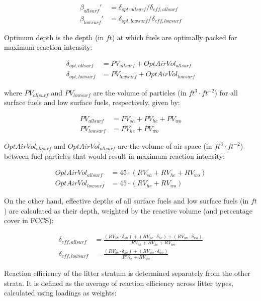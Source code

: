 \documentclass[]{book}
\begin{document}
\begin{eqnarray} 
\beta_{allsurf}' &= \delta_{opt, allsurf} / \delta_{eff, allsurf} \\
\beta_{lowsurf}' &= \delta_{opt, lowsurf} / \delta_{eff, lowsurf}
\label{eq:relpacking}
\end{eqnarray}

Optimum depth is the depth (in \(ft\)) at which fuels are optimally
packed for maximum reaction intensity:

\begin{eqnarray}
\delta_{opt, allsurf} &= PV_{allsurf} +OptAirVol_{allsurf}\\
\delta_{opt, lowsurf} &= PV_{lowsurf} +OptAirVol_{lowsurf}
\end{eqnarray}

where \(PV_{allsurf}\) and \(PV_{lowsurf}\) are the volume of particles
(in \(ft^3 \cdot ft^{-2}\)) for all surface fuels and low surface fuels,
respectively, given by:

\begin{eqnarray}
PV_{allsurf} &= PV_{sh} + PV_{he} + PV_{wo}\\
PV_{lowsurf} &= PV_{he} + PV_{wo}
\end{eqnarray}

\(OptAirVol_{allsurf}\) and \(OptAirVol_{allsurf}\) are the volume of
air space (in \(ft^3 \cdot ft^{-2}\)) between fuel particles that would
result in maximum reaction intensity:

\begin{eqnarray}
OptAirVol_{allsurf} &= 45\cdot (RV_{sh} + RV_{he} + RV_{wo})\\
OptAirVol_{lowsurf} &= 45\cdot (RV_{he} + RV_{wo})
\end{eqnarray}

On the other hand, effective depths of all surface fuels and low surface
fuels (in \(ft\)) are calculated as their depth, weighted by the
reactive volume (and percentage cover in FCCS):

\begin{eqnarray}
\delta_{eff, allsurf} &= \frac{(RV_{sh}\cdot \delta_{sh}) +(RV_{he}\cdot \delta_{he}) + (RV_{wo}\cdot \delta_{wo})}{RV_{sh} +RV_{he}+RV_{wo}}\\
\delta_{eff, lowsurf} &= \frac{(RV_{he}\cdot \delta_{he}) + (RV_{wo}\cdot \delta_{wo})}{RV_{he}+RV_{wo}}
\end{eqnarray}

Reaction efficiency of the litter stratum is determined separately from
the other strata. It is defined as the average of reaction efficiency
across litter types, calculated using loadings as weights:
\end{document}
